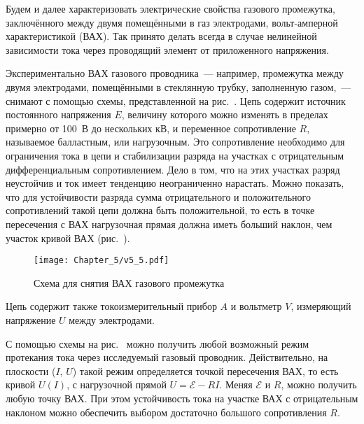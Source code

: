 Будем и далее характеризовать электрические свойства газового промежутка,
заключённого между двумя помещёнными в газ
электродами, вольт-амперной характеристикой (ВАХ). Так принято делать всегда в
случае нелинейной зависимости тока через
проводящий элемент от приложенного напряжения.

Экспериментально ВАХ газового проводника~--- например, промежутка между двумя
электродами, помещёнными в стеклянную
трубку, заполненную газом,~--- снимают с помощью схемы, представленной на
рис.~. Цепь содержит источник постоянного
напряжения $E$, величину которого можно изменять в пределах примерно от 100~В до
нескольких кВ, и переменное
сопротивление $R$, называемое балластным, или нагрузочным. Это сопротивление
необходимо для ограничения тока в цепи и
стабилизации разряда на участках с отрицательным дифференциальным
сопротивлением. Дело в том, что на этих участках
разряд неустойчив и ток имеет тенденцию неограниченно нарастать. Можно показать,
что для устойчивости разряда сумма
отрицательного и положительного сопротивлений такой цепи должна быть
положительной, то есть в точке пересечения с ВАХ
нагрузочная прямая должна иметь больший наклон, чем участок кривой ВАХ
(рис.~).

\begin{figure}[h!]
	\centering
	\texttt{[image: Chapter\_5/v5\_5.pdf]}
	\caption{Схема для снятия ВАХ газового промежутка}
\end{figure}


Цепь содержит также токоизмерительный прибор $A$ и вольтметр $V$, измеряющий
напряжение $U$ между электродами.

С помощью схемы на рис.~ можно получить любой
возможный режим протекания тока через исследуемый газовый проводник.
Действительно, на плоскости ($I$, $U$) такой режим определяется точкой
пересечения ВАХ, то есть кривой $U(I)$, с
нагрузочной прямой $U=\mathcal{E}-RI$. Меняя $\mathcal{E}$ и $R$, можно получить
любую точку ВАХ. При этом устойчивость тока на участке
ВАХ с отрицательным наклоном можно обеспечить выбором достаточно большого
сопротивления $R$.

